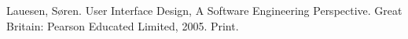 \begin{thebibliography}{9}
 Lauesen, Søren. User Interface Design, A Software Engineering Perspective. Great Britain: Pearson Educated Limited, 2005.  Print.
\end{thebibliography}
\label{A_BIB}